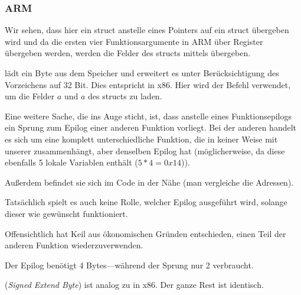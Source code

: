 \subsubsection{ARM}

\myparagraph{\OptimizingKeilVI (\ThumbMode)}


Wir sehen, dass hier ein struct anstelle eines Pointers auf ein struct übergeben wird und da die ersten vier
Funktionsargumente in ARM über Register übergeben werden, werden die Felder des structs mittels  übergeben.

 lädt ein Byte aus dem Speicher und erweitert es unter Berücksichtigung des Vorzeichens auf 32 Bit.
Dies entspricht \MOVSX in x86. 
Hier wird der Befehl verwendet, um die Felder $a$ und $a$ des structs zu laden.

Eine weitere Sache, die ins Auge sticht, ist, dass anstelle eines Funktionsepilogs ein Sprung zum Epilog einer anderen
Funktion vorliegt.
Bei der anderen handelt es sich um eine komplett unterschiedliche Funktion, die in keiner Weise mit unserer
zusammenhängt, aber denselben Epilog hat (möglicherweise, da diese ebenfalls 5 lokale Variablen enthält ($5*4=0x14$)).

Außerdem befindet sie sich im Code in der Nähe (man vergleiche die Adressen).

Tatsächlich spielt es auch keine Rolle, welcher Epilog ausgeführt wird, solange dieser wie gewünscht funktioniert.

Offensichtlich hat Keil aus ökonomischen Gründen entschieden, einen Teil der anderen Funktion wiederzuverwenden.

Der Epilog benötigt 4 Bytes---während der Sprung nur 2 verbraucht.




 (\emph{Signed Extend Byte}) ist analog zu \MOVSX in x86.
Der ganze Rest ist identisch.

